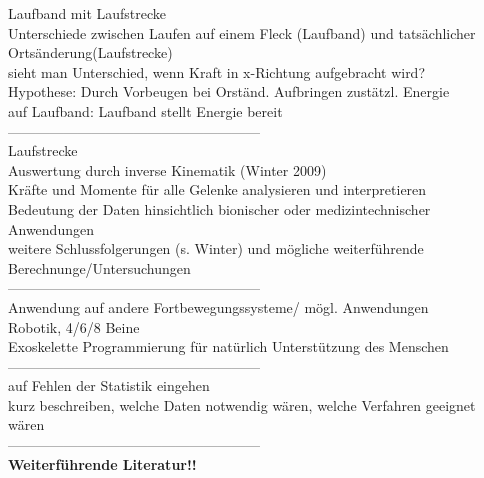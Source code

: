 Laufband mit Laufstrecke\\
Unterschiede zwischen Laufen auf einem Fleck (Laufband) und tatsächlicher Ortsänderung(Laufstrecke)\\
sieht man Unterschied, wenn Kraft in x-Richtung aufgebracht wird?\\
Hypothese: Durch Vorbeugen bei Orständ. Aufbringen zustätzl. Energie\\
auf Laufband: Laufband stellt Energie bereit\\
------------------------------------------------------\\
Laufstrecke\\
Auswertung durch inverse Kinematik (Winter 2009)\\
Kräfte und Momente für alle Gelenke analysieren und interpretieren\\
Bedeutung der Daten hinsichtlich bionischer oder medizintechnischer Anwendungen\\
weitere Schlussfolgerungen (s. Winter) und mögliche weiterführende Berechnunge/Untersuchungen\\
------------------------------------------------------\\
Anwendung auf andere Fortbewegungssysteme/ mögl. Anwendungen\\
Robotik, 4/6/8 Beine\\
Exoskelette Programmierung für natürlich Unterstützung des Menschen\\
------------------------------------------------------\\
auf Fehlen der Statistik eingehen\\
kurz beschreiben, welche Daten notwendig wären, welche Verfahren geeignet wären\\
------------------------------------------------------\\
\textbf{Weiterführende Literatur!!}\\
\clearpage

